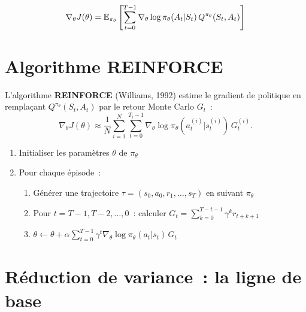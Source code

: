\begin{formules}[title=\textbf{Th\'eor\`eme du gradient de politique}]
\[
    \nabla_\theta J(\theta) = \mathbb{E}_{\pi_\theta}\left[
    \sum_{t=0}^{T-1} \nabla_\theta \log \pi_\theta(A_t | S_t) \, Q^{\pi_\theta}(S_t, A_t)
    \right]
\]
\end{formules}

\section{Algorithme REINFORCE}

\begin{definition}[REINFORCE]
L'algorithme \textbf{REINFORCE} (Williams, 1992) estime le gradient de politique
en rempla\c{c}ant $Q^{\pi_\theta}(S_t, A_t)$ par le retour Monte Carlo $G_t$~:
\[
    \nabla_\theta J(\theta) \approx \frac{1}{N} \sum_{i=1}^{N} \sum_{t=0}^{T_i-1}
    \nabla_\theta \log \pi_\theta(a_t^{(i)} | s_t^{(i)}) \, G_t^{(i)}.
\]
\end{definition}

\begin{algorithme}[title=\textbf{REINFORCE}]
\begin{enumerate}
    \item Initialiser les param\`etres $\theta$ de $\pi_\theta$
    \item Pour chaque \'episode~:
    \begin{enumerate}
        \item G\'en\'erer une trajectoire $\tau = (s_0, a_0, r_1, \ldots, s_T)$
        en suivant $\pi_\theta$
        \item Pour $t = T-1, T-2, \ldots, 0$~: calculer $G_t = \sum_{k=0}^{T-t-1} \gamma^k r_{t+k+1}$
        \item $\theta \leftarrow \theta + \alpha \sum_{t=0}^{T-1} \gamma^t \nabla_\theta \log \pi_\theta(a_t | s_t) \, G_t$
    \end{enumerate}
\end{enumerate}
\end{algorithme}

\section{R\'eduction de variance~: la ligne de base}


